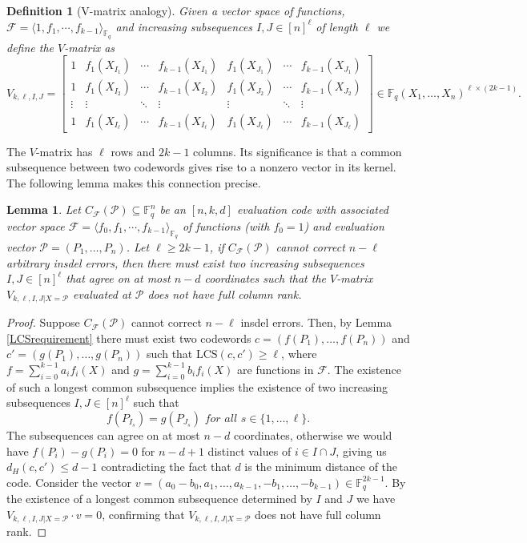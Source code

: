 \documentclass[draft, onecolumn, 11pt]{IEEEtran}
\newtheorem{definition}[theorem]{Definition}
\newtheorem{lemma}[theorem]{Lemma}
\newcommand{\F}{\mathbb{F}}
\begin{document}
\begin{definition}[V-matrix analogy]
	Given a vector space of functions, $\mathcal{F} = \langle 1, f_1, \dotsm , f_{k-1}\rangle_{\F_q}$ and increasing subsequences $I, J \in [n]^\ell$ of length $\ell$ we define the $V$-matrix as
	$$V_{k,\ell, I, J} = \begin{bmatrix}
	1 & f_1(X_{I_1}) & \cdots & f_{k-1}(X_{I_1}) & f_1(X_{J_1}) & \cdots & f_{k-1}(X_{J_1}) \\
	1 & f_1(X_{I_2}) & \cdots & f_{k-1}(X_{I_2}) & f_1(X_{J_2}) & \cdots & f_{k-1}(X_{J_2}) \\
	\vdots & \vdots & \ddots & \vdots & \vdots & \ddots & \vdots \\
	1 & f_1(X_{I_\ell}) & \cdots & f_{k-1}(X_{I_\ell}) & f_1(X_{J_\ell}) & \cdots & f_{k-1}(X_{J_\ell}) 
	\end{bmatrix} \in \F_q(X_1, \dots, X_n)^{\ell \times (2k - 1)}.$$  
\end{definition}

The $V$-matrix has $\ell$ rows and $2k-1$ columns. Its significance is that a common subsequence between two codewords gives rise to a nonzero vector in its kernel. The following lemma makes this connection precise.

\begin{lemma} \label{notHalfsingleton}
	Let $C_{\mathcal{F}}(\mathcal{P}) \subseteq \F_q^n$ be an $[n,k,d]$ evaluation code with associated vector space $\mathcal{F} = \langle f_0, f_1, \dotsm , f_{k-1}\rangle_{\F_q}$ of functions (with $f_0 = 1$) and evaluation vector $\mathcal{P} = (P_1, \dots, P_n)$. Let $\ell \geq 2k-1$, if $C_{\mathcal{F}}(\mathcal{P})$ cannot correct $n-\ell$ arbitrary insdel errors, then there must exist two increasing subsequences $I,J \in [n]^\ell$ that agree on at most $n-d$ coordinates such that the $V$-matrix $V_{k,\ell,I,J|X = \mathcal{P}}$ evaluated at $\mathcal{P}$ does not have full column rank.
\end{lemma}

\begin{proof}
	Suppose $C_{\mathcal{F}}(\mathcal{P})$ cannot correct $n-\ell$ insdel errors. Then, by Lemma \ref{LCSrequirement} there must exist two codewords $c = (f(P_1), \dots, f(P_n))$ and $c' = (g(P_1), \dots, g(P_n))$ such that $\mathrm{LCS}(c,c') \geq \ell$, where $f = \sum_{i = 0}^{k-1} a_if_i(X)$ and $g = \sum_{i = 0}^{k-1} b_if_i(X)$ are functions in $\mathcal{F}$. The existence of such a longest common subsequence implies the existence of two increasing subsequences $I,J \in [n]^\ell$ such that $$f(P_{I_s}) = g(P_{J_s}) \textit{ for all } s \in \{1, \dots ,\ell\}.$$
	The subsequences can agree on at most $n-d$ coordinates, otherwise we would have $f(P_i) - g(P_i) = 0$ for $n-d+1$ distinct values of $i \in I \cap J$, giving us $d_H(c,c') \leq d-1$ contradicting the fact that $d$ is the minimum distance of the code.
	Consider the vector $v = (a_0 - b_0, a_1, \dots, a_{k-1}, -b_1, \dots, -b_{k-1}) \in \F_q^{2k-1}$. By the existence of a longest common subsequence determined by $I$ and $J$ we have $V_{k,\ell, I,J | X = \mathcal{P}} \cdot v = 0$, confirming that $V_{k,\ell, I,J | X = \mathcal{P}}$ does not have full column rank.	      
\end{proof}
\end{document}
